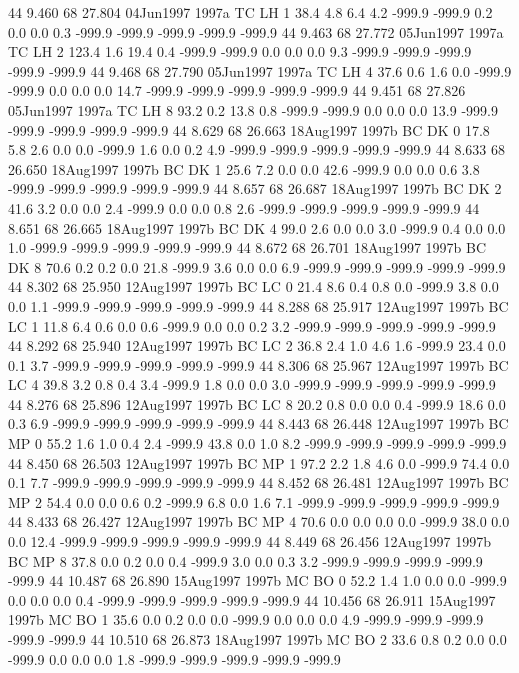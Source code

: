44 9.460	68 27.804	04Jun1997	1997a	TC	LH	1	38.4	4.8	6.4	4.2	-999.9	-999.9	0.2	0.0	0.0	0.3	-999.9	-999.9	-999.9	-999.9	-999.9
44 9.463	68 27.772	05Jun1997	1997a	TC	LH	2	123.4	1.6	19.4	0.4	-999.9	-999.9	0.0	0.0	0.0	9.3	-999.9	-999.9	-999.9	-999.9	-999.9
44 9.468	68 27.790	05Jun1997	1997a	TC	LH	4	37.6	0.6	1.6	0.0	-999.9	-999.9	0.0	0.0	0.0	14.7	-999.9	-999.9	-999.9	-999.9	-999.9
44 9.451	68 27.826	05Jun1997	1997a	TC	LH	8	93.2	0.2	13.8	0.8	-999.9	-999.9	0.0	0.0	0.0	13.9	-999.9	-999.9	-999.9	-999.9	-999.9
44 8.629	68 26.663	18Aug1997	1997b	BC	DK	0	17.8	5.8	2.6	0.0	0.0	-999.9	1.6	0.0	0.2	4.9	-999.9	-999.9	-999.9	-999.9	-999.9
44 8.633	68 26.650	18Aug1997	1997b	BC	DK	1	25.6	7.2	0.0	0.0	42.6	-999.9	0.0	0.0	0.6	3.8	-999.9	-999.9	-999.9	-999.9	-999.9
44 8.657	68 26.687	18Aug1997	1997b	BC	DK	2	41.6	3.2	0.0	0.0	2.4	-999.9	0.0	0.0	0.8	2.6	-999.9	-999.9	-999.9	-999.9	-999.9
44 8.651	68 26.665	18Aug1997	1997b	BC	DK	4	99.0	2.6	0.0	0.0	3.0	-999.9	0.4	0.0	0.0	1.0	-999.9	-999.9	-999.9	-999.9	-999.9
44 8.672	68 26.701	18Aug1997	1997b	BC	DK	8	70.6	0.2	0.2	0.0	21.8	-999.9	3.6	0.0	0.0	6.9	-999.9	-999.9	-999.9	-999.9	-999.9
44 8.302	68 25.950	12Aug1997	1997b	BC	LC	0	21.4	8.6	0.4	0.8	0.0	-999.9	3.8	0.0	0.0	1.1	-999.9	-999.9	-999.9	-999.9	-999.9
44 8.288	68 25.917	12Aug1997	1997b	BC	LC	1	11.8	6.4	0.6	0.0	0.6	-999.9	0.0	0.0	0.2	3.2	-999.9	-999.9	-999.9	-999.9	-999.9
44 8.292	68 25.940	12Aug1997	1997b	BC	LC	2	36.8	2.4	1.0	4.6	1.6	-999.9	23.4	0.0	0.1	3.7	-999.9	-999.9	-999.9	-999.9	-999.9
44 8.306	68 25.967	12Aug1997	1997b	BC	LC	4	39.8	3.2	0.8	0.4	3.4	-999.9	1.8	0.0	0.0	3.0	-999.9	-999.9	-999.9	-999.9	-999.9
44 8.276	68 25.896	12Aug1997	1997b	BC	LC	8	20.2	0.8	0.0	0.0	0.4	-999.9	18.6	0.0	0.3	6.9	-999.9	-999.9	-999.9	-999.9	-999.9
44 8.443	68 26.448	12Aug1997	1997b	BC	MP	0	55.2	1.6	1.0	0.4	2.4	-999.9	43.8	0.0	1.0	8.2	-999.9	-999.9	-999.9	-999.9	-999.9
44 8.450	68 26.503	12Aug1997	1997b	BC	MP	1	97.2	2.2	1.8	4.6	0.0	-999.9	74.4	0.0	0.1	7.7	-999.9	-999.9	-999.9	-999.9	-999.9
44 8.452	68 26.481	12Aug1997	1997b	BC	MP	2	54.4	0.0	0.0	0.6	0.2	-999.9	6.8	0.0	1.6	7.1	-999.9	-999.9	-999.9	-999.9	-999.9
44 8.433	68 26.427	12Aug1997	1997b	BC	MP	4	70.6	0.0	0.0	0.0	0.0	-999.9	38.0	0.0	0.0	12.4	-999.9	-999.9	-999.9	-999.9	-999.9
44 8.449	68 26.456	12Aug1997	1997b	BC	MP	8	37.8	0.0	0.2	0.0	0.4	-999.9	3.0	0.0	0.3	3.2	-999.9	-999.9	-999.9	-999.9	-999.9
44 10.487	68 26.890	15Aug1997	1997b	MC	BO	0	52.2	1.4	1.0	0.0	0.0	-999.9	0.0	0.0	0.0	0.4	-999.9	-999.9	-999.9	-999.9	-999.9
44 10.456	68 26.911	15Aug1997	1997b	MC	BO	1	35.6	0.0	0.2	0.0	0.0	-999.9	0.0	0.0	0.0	4.9	-999.9	-999.9	-999.9	-999.9	-999.9
44 10.510	68 26.873	18Aug1997	1997b	MC	BO	2	33.6	0.8	0.2	0.0	0.0	-999.9	0.0	0.0	0.0	1.8	-999.9	-999.9	-999.9	-999.9	-999.9

